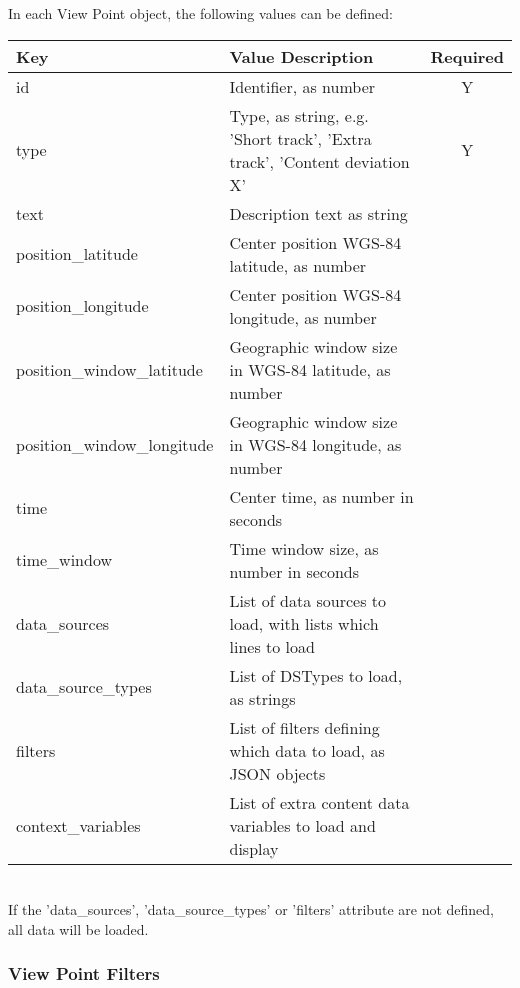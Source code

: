 In each View Point object, the following values can be defined:

\begin{center}
 \begin{table}[H]
  \begin{tabularx}{\textwidth}{ | l | X | c | }
    \hline
    \textbf{Key} & \textbf{Value Description} & \textbf{Required} \\ \hline
    id & Identifier, as number & Y \\ \hline
    type & Type, as string, e.g. 'Short track', 'Extra track', 'Content deviation X' & Y   \\ \hline
    text & Description text as string &    \\ \hline
    position\_latitude & Center position WGS-84 latitude, as number &    \\ \hline
    position\_longitude & Center position WGS-84 longitude, as number &    \\ \hline
    position\_window\_latitude & Geographic window size in WGS-84 latitude, as number &    \\ \hline
    position\_window\_longitude & Geographic window size in WGS-84 longitude, as number &    \\ \hline
    time & Center time, as number in seconds &    \\ \hline
    time\_window & Time window size, as number in seconds &    \\ \hline
    data\_sources & List of data sources to load, with lists which lines to load &    \\ \hline
    data\_source\_types & List of DSTypes to load, as strings &    \\ \hline
    filters & List of filters defining which data to load, as JSON objects &   \\ \hline
    context\_variables & List of extra content data variables to load and display &    \\ \hline
\end{tabularx}
\end{table}
\end{center}
\ \\

If the 'data\_sources', 'data\_source\_types' or 'filters' attribute are not defined, all data will be loaded.

\subsubsection{View Point Filters}

